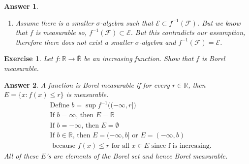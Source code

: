 \documentclass[12pt]{article}
\theoremstyle{colon}
\newtheorem{exercise}{Exercise}
\newtheorem*{answer}{Answer}
\begin{document}
\begin{answer}
\begin{enumerate}[label=(\roman*)]
\begin{align*}
        &\Longleftrightarrow A^c \in f^{-1}(\mathcal{F})
      \end{align*}
      Union:
      \begin{align*}
        A_n \in f^{-1}(\mathcal{F}) &\Longleftrightarrow A_n = f^{-1}(B_n) \text{ for some } B_n \\
        &\Longleftrightarrow \bigcup_{n \geq 1} A_n = \bigcup_{n \geq 1} f^{-1}(B_n) \\
        &\Longleftrightarrow \bigcup_{n \geq 1} A_n = f^{-1}\big(\bigcup_{n \geq 1} B_n \big) \\
      \end{align*}
      Note that $\bigcup_{n \geq 1} B_n \in \mathcal{F}$ since it is $\sigma$-algebra
      \begin{align*}
        &\Longleftrightarrow \bigcup_{n \geq 1} A_n  \in f^{-1}(\mathcal{F})
      \end{align*}
      Also, $E \in f^{-1}(\mathcal{F})$ since $f^{-1}(F) = E$. Thus, $f^{-1}(\mathcal{F})$ is a $\sigma$-algebra.

      \item Assume there is a smaller $\sigma$-algebra such that $\mathcal{E} \subset f^{-1}(\mathcal{F})$. But we know that $f$ is measurable so, $f^{-1}(\mathcal{F}) \subset \mathcal{E}$. But this contradicts our assumption, therefore there does not exist a smaller $\sigma$-algebra and $f^{-1}(\mathcal{F}) = \mathcal{E}$.
  \end{enumerate}
\end{answer}

\clearpage

\begin{exercise}
  Let $f: \mathbb{R} \rightarrow \overline{\mathbb{R}}$ be an increasing function. Show that $f$ is Borel measurable.
\end{exercise}

\begin{answer}
  A function is Borel measurable if for every $r \in \mathbb{R}$, then $E = \{ x: f(x) \leq r\}$ is measurable.
  \begin{align*}
    &\text{Define } b = \sup f^{-1}\big((-\infty, r]\big) \\
    &\text{If } b = \infty \text{, then } E = \mathbb{R} \\
    &\text{If } b = -\infty \text{, then } E = \emptyset \\
    &\text{If } b \in \mathbb{R} \text{, then } E = (-\infty, b] \text{ or } E = (-\infty, b) \\
    &\text{ because } f(x) \leq r \text{ for all } x \in E \text{ since f is increasing.}
  \end{align*}
  All of these $E$'s are elements of the Borel set and hence Borel measurable.
\end{answer}
\end{document}
